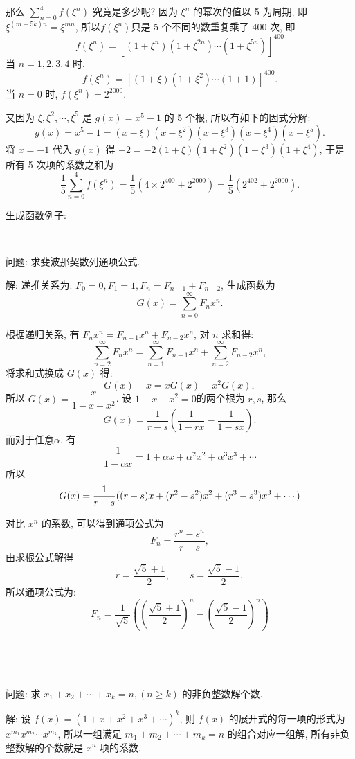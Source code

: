 那么 $\displaystyle \sum_{n=0}^4{f(\xi^n)}$ 究竟是多少呢? 因为 $\xi^n$ 的幂次的值以 5 为周期, 即$\xi^{(m+5k)n}=\xi^{mn}$, 所以$f(\xi^n)$只是 5 个不同的数重复乘了 400 次, 即 
\[f(\xi^n)=\left[(1+\xi^n)(1+\xi^{2n})\cdots(1+\xi^{5n})\right]^{400}\]
当 $n=1,2,3,4$ 时,
\[f(\xi^n) = \left[(1+\xi)(1+\xi^{2})\cdots(1+1)\right]^{400}.\]
当 $n=0$ 时, $f(\xi^n)=2^{2000}$.

又因为 $\xi, \xi^2, \cdots, \xi^5$ 是 $g(x)=x^5-1$ 的 5 个根, 所以有如下的因式分解:
\[g(x) = x^5-1=(x-\xi)(x-\xi^2)(x-\xi^3)(x-\xi^4)(x-\xi^5).\]
将 $x=-1$ 代入 $g(x)$ 得 $-2 = -2(1+\xi)(1+\xi^2)(1+\xi^3)(1+\xi^4)$, 于是所有 5 次项的系数之和为
\[\frac{1}{5}\sum_{n=0}^4{f(\xi^n)}=\frac{1}{5}\left(4\times 2^{400}+2^{2000}\right) = \frac{1}{5}\left(2^{402}+2^{2000}\right).\]


\newpage
\noindent 生成函数例子:

~

\noindent 问题: 求斐波那契数列通项公式.

\noindent 解: 递推关系为: $F_0=0, F_1=1, F_n = F_{n-1} + F_{n-2}$, 生成函数为 
\[
G(x) = \sum_{n=0}^\infty{F_nx^n} .
\]

根据递归关系, 有 $ F_nx^n = F_{n-1}x^n+F_{n-2}x^n $, 对 $n$ 求和得:
\[
\sum_{n=2}^{\infty}{F_nx^n} = \sum_{n=1}^{\infty}{F_{n-1}x^n} + \sum_{n=2}^{\infty}{F_{n-2}x^n} ,
\]
将求和式换成 $G(x)$ 得:
\[
G(x) - x = xG(x) + x^2G(x) ,
\]
所以 $G(x) = \dfrac{x}{1-x-x^2}$. 设 $1-x-x^2=0$的两个根为 $r,s$, 那么
\[
G(x) = \frac{1}{r-s}\left(\frac{1}{1-rx} - \frac{1}{1-sx}\right) .
\]
而对于任意$\alpha$, 有 
\[\frac{1}{1-\alpha x} = 1+\alpha x+\alpha^2x^2 + \alpha^3x^3 + \cdots\]
所以
\[
G(x) = \frac{1}{r-s}((r-s)x + (r^2-s^2)x^2 + (r^3-s^3)x^3 + \cdots) \\
\]

对比 $x^n$ 的系数, 可以得到通项公式为 
$$F_n = \dfrac{r^n - s^n}{r-s},$$ 
由求根公式解得 
$$r=\dfrac{\sqrt{5}+1}{2}, \qquad s=\dfrac{\sqrt{5}-1}{2},$$ 
所以通项公式为:
\[F_n = \frac{1}{\sqrt{5}}\left( \left(\frac{\sqrt{5}+1}{2} \right)^n - \left(\frac{\sqrt{5}-1}{2} \right)^n \right)\]

~

~

\noindent 问题: 求 $x_1 + x_2 + \cdots + x_k = n, (n\ge k)$ 的非负整数解个数.

解: 设 $f(x) = (1+x+x^2+x^3+\cdots)^k$, 则 $f(x)$ 的展开式的每一项的形式为 $x^{m_1}x^{m_2}\cdots x^{m_k}$, 所以一组满足 $m_1+m_2+\cdots+m_k=n$ 的组合对应一组解, 所有非负整数解的个数就是 $x^n$ 项的系数.

